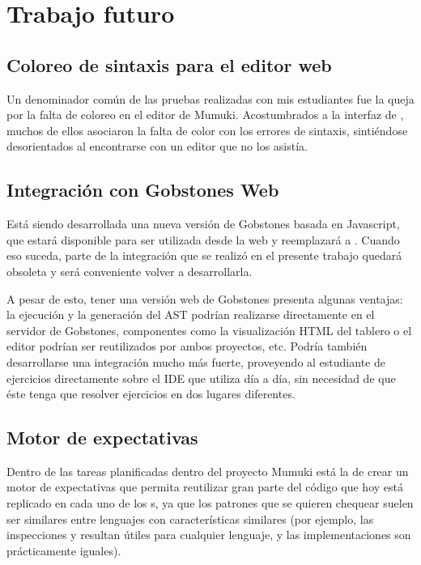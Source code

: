 
\section{Trabajo futuro}

\subsection{Coloreo de sintaxis para el editor web}
Un denominador común de las pruebas realizadas con mis estudiantes fue la queja por la falta de coloreo en el editor de Mumuki. Acostumbrados a la interfaz de \pyGob, muchos de ellos asociaron la falta de color con los errores de sintaxis, sintiéndose desorientados al encontrarse con un editor que no los asistía.

\subsection{Integración con Gobstones Web}
Está siendo desarrollada una nueva versión de Gobstones basada en Javascript, que estará disponible para ser utilizada desde la web y reemplazará a \pyGob. Cuando eso suceda, parte de la integración que se realizó en el presente trabajo quedará obsoleta y será conveniente volver a desarrollarla.

A pesar de esto, tener una versión web de Gobstones presenta algunas ventajas: la ejecución y la generación del AST podrían realizarse directamente en el servidor de Gobstones, componentes como la visualización HTML del tablero o el editor podrían ser reutilizados por ambos proyectos, etc. Podría también desarrollarse una integración mucho más fuerte, proveyendo al estudiante de ejercicios directamente sobre el IDE que utiliza día a día, sin necesidad de que éste tenga que resolver ejercicios en dos lugares diferentes.

\subsection{Motor de expectativas}
Dentro de las tareas planificadas dentro del proyecto Mumuki está la de crear un motor de expectativas que permita reutilizar gran parte del código que hoy está replicado en cada uno de los \runner s, ya que los patrones que se quieren chequear suelen ser similares entre lenguajes con características similares (por ejemplo, las inspecciones  y  resultan útiles para cualquier lenguaje, y las implementaciones son prácticamente iguales).

